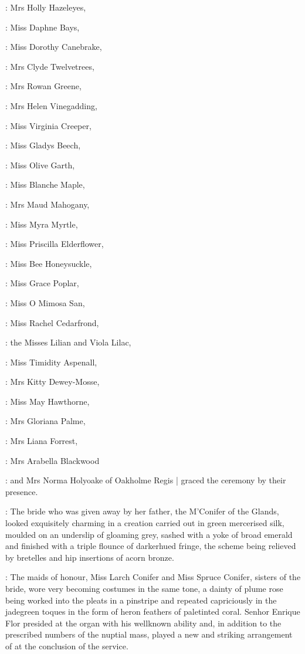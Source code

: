 :
Mrs Holly Hazeleyes,

:
Miss Daphne Bays,

:
Miss Dorothy Canebrake,

:
Mrs Clyde Twelvetrees,

:
Mrs Rowan Greene,

:
Mrs Helen Vinegadding,

:
Miss Virginia Creeper,

:
Miss Gladys Beech,

:
Miss Olive Garth,

:
Miss Blanche Maple,

:
Mrs Maud Mahogany,

:
Miss Myra Myrtle,

:
Miss Priscilla Elderflower,

:
Miss Bee Honeysuckle,

:
Miss Grace Poplar,

:
Miss O Mimosa San,

:
Miss Rachel Cedarfrond,

:
the Misses Lilian and Viola Lilac,

:
Miss Timidity Aspenall,

:
Mrs Kitty Dewey-Mosse,

:
Miss May Hawthorne,

:
Mrs Gloriana Palme,

:
Mrs Liana Forrest,

:
Mrs Arabella Blackwood

:
and Mrs Norma Holyoake of Oakholme Regis |
graced the ceremony by their presence.

:
The bride who was given away by her father,
the M'Conifer of the Glands,
looked exquisitely charming in a creation carried out in green
mercerised silk,
moulded on an underslip of gloaming grey,
sashed with a yoke of broad emerald and finished with a triple flounce of darkerhued fringe,
the scheme being relieved by bretelles and hip insertions of acorn bronze.

:
The maids of honour,
Miss Larch Conifer and Miss Spruce Conifer,
sisters of the bride,
wore very becoming costumes in the same tone,
a dainty  of plume rose
being worked into the pleats in a pinstripe and
repeated capriciously in the jadegreen toques
in the form of heron feathers of paletinted coral.
Senhor Enrique Flor presided at the organ with his wellknown ability
and,
in addition to the prescribed
numbers of the nuptial mass,
played a new and striking arrangement of
at the conclusion of the service.

